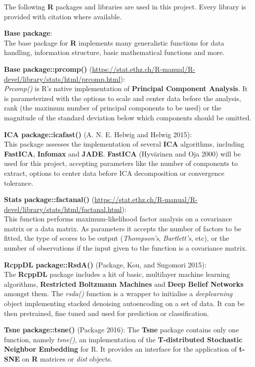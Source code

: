 \documentclass[]{article}
\begin{document}
The following \textbf{R} packages and libraries are used in this
project. Every library is provided with citation where available.

\textbf{Base package}:\\The base package for \textbf{R} implements many
generalistic functions for data handling, information structure, basic
mathematical functions and more.

\textbf{Base package::prcomp()}
(\url{https://stat.ethz.ch/R-manual/R-devel/library/stats/html/prcomp.html}):\\\emph{Prcomp()}
is R's native implementation of \textbf{Principal Component Analysis}.
It is parameterized with the options to scale and center data before the
analysis, rank (the maximum number of principal components to be used)
or the magnitude of the standard deviation below which components should
be omitted.

\textbf{ICA package::icafast()} (A. N. E. Helwig and Helwig 2015):\\This
package assesses the implementation of several \textbf{ICA} algorithms,
including \textbf{FastICA}, \textbf{Infomax} and \textbf{JADE}.
\textbf{FastICA} (Hyv{ä}rinen and Oja 2000) will be used for this
project, accepting parameters like the number of components to extract,
options to center data before ICA decomposition or convergence
tolerance.

\textbf{Stats package::factanal()}
(\url{https://stat.ethz.ch/R-manual/R-devel/library/stats/html/factanal.html}):\\This
function performs maximum-likelihood factor analysis on a covariance
matrix or a data matrix. As parameters it accepts the number of factors
to be fitted, the type of scores to be output (\emph{Thompson's},
\emph{Bartlett's}, etc), or the number of observations if the input
given to the function is a covariance matrix.

\textbf{RcppDL package::RsdA()} (Package, Kou, and Sugomori 2015):\\The
\textbf{RcppDL} package includes a kit of basic, multilayer machine
learning algorithms, \textbf{Restricted Boltzmann Machines} and
\textbf{Deep Belief Networks} amongst them. The \emph{rsda()} function
is a wrapper to initialise a \emph{deeplearning} object implementing
stacked denoising autoencoding on a set of data. It can be then
pretrained, fine tuned and used for prediction or classification.

\textbf{Tsne package::tsne()} (Package 2016): The \textbf{Tsne} package
contains only one function, namely \emph{tsne()}, an implementation of
the \textbf{T-distributed Stochastic Neighbor Embedding} for R. It
provides an interface for the application of \textbf{t-SNE} on
\textbf{R} matrices or \emph{dist} objects.
\end{document}
